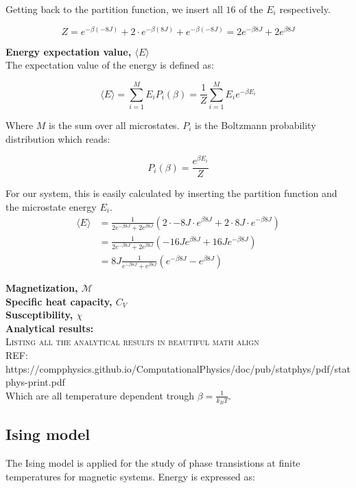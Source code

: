 \documentclass[../main.tex]{subfiles}
\begin{document}
    Getting back to the partition function, we insert all $16$ of the $E_i$ respectively.

    \[Z = e^{-\beta (-8J)} + 2 \cdot e^{-\beta (8J)} + e^{-\beta (-8J)} = 2e^{-\beta 8J} + 2e^{\beta 8J}\]

    \textbf{Energy expectation value, $\langle E \rangle$}\\
    The expectation value of the energy is defined as:

    \[\langle E \rangle = \sum_{i=1}^M E_i P_i(\beta) = \frac{1}{Z}\sum_{i=1}^M E_i e^{-\beta E_i}\]

    Where $M$ is the sum over all microstates. $P_i$ is the Boltzmann probability distribution which reads:

    \[P_i(\beta) = \frac{e^{\beta E_i}}{Z}\]

    For our system, this is easily calculated by inserting the partition function and the microstate energy $E_i$.
    \begin{align*}
      \langle E \rangle &= \frac{1}{2e^{-\beta 8J} + 2e^{\beta 8J}} \left(2 \cdot -8J \cdot e^{\beta 8J} + 2\cdot 8J \cdot e^{-\beta8J}\right)\\
        &= \frac{1}{2e^{-\beta 8J} + 2e^{\beta 8J}} \left(-16J e^{\beta8J} + 16Je^{-\beta 8J}\right)\\
        &= 8J \frac{1}{e^{-\beta 8J} + e^{\beta 8J}}  \left(e^{-\beta8J} - e^{\beta 8J}\right)
    \end{align*}

    \textbf{Magnetization, $\mathcal{M}$}\\
    \textbf{Specific heat capacity, $C_V$}\\
    \textbf{Susceptibility, $\chi$}\\

    \textbf{Analytical results:}\\
    \textsc{Listing all the analytical results in beautiful math align}\\
    REF: https://compphysics.github.io/ComputationalPhysics/doc/pub/statphys/pdf/statphys-print.pdf\\

    Which are all temperature dependent trough $\beta = \frac{1}{k_B T}$.


    \subsection{Ising model}
    The Ising model is applied for the study of phase transistions at finite temperatures
    for magnetic systems. Energy is expressed as:
\end{document}
